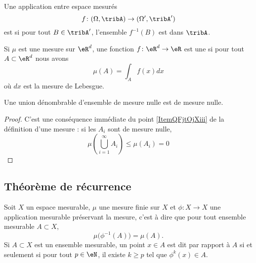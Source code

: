 \begin{definition}
    Une application entre espace mesurés
    \begin{equation}
        f\colon (\Omega,\tribA)\to (\Omega',\tribA')
    \end{equation}
    est  si pour tout \( B\in\tribA'\), l'ensemble \( f^{-1}(B)\) est dans \( \tribA\).
\end{definition}

Si \( \mu\) est une mesure sur \( \eR^d\), une fonction \( f\colon \eR^d\to \eR\) est une  si pour tout \( A\subset\eR^d\) nous avons
\begin{equation}
    \mu(A)=\int_Af(x)dx
\end{equation}
où \( dx\) est la mesure de Lebesgue.

\begin{lemma}   \label{LemIDITgAy}
    Une union dénombrable d'ensemble de mesure nulle est de mesure nulle.
\end{lemma}

\begin{proof}
    C'est une conséquence immédiate du point \ref{ItemQFjtOjXiii} de la définition d'une mesure : si les \( A_i\) sont de mesure nulle,
    \begin{equation}
        \mu\left( \bigcup_{i=1}^{\infty}A_i \right)\leq \mu(A_i)=0
    \end{equation}
\end{proof}

\subsection{Théorème de récurrence}

Soit \( X\) un espace mesurable, \( \mu\) une mesure finie sur \( X\) et \( \phi\colon X\to X\) une application mesurable préservant la mesure, c'est à dire que pour tout ensemble mesurable \( A\subset X\),
\begin{equation}
    \mu\big( \phi^{-1}(A) \big)=\mu(A).
\end{equation}
Si \( A\subset X\) est un ensemble mesurable, un point \( x\in A\) est dit  par rapport à \( A\) si et seulement si pour tout \( p\in \eN\), il existe \( k\geq p\) tel que \( \phi^k(x)\in A\).

